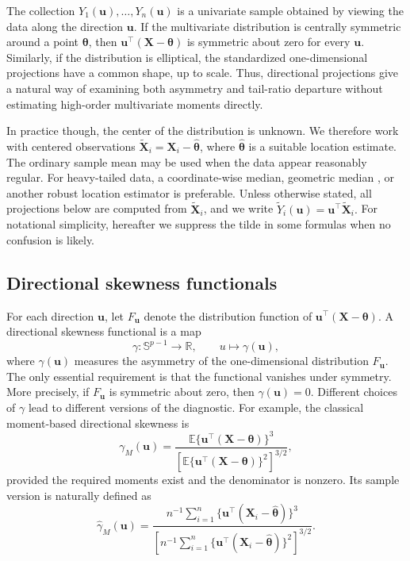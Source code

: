 \documentclass[11pt]{article}
\theoremstyle{plain}
\theoremstyle{definition}
\theoremstyle{remark}
\def\E{\mathbb{E}}
\def\X{\bm{X}}
\def\u{\bm{u}}
\newcommand{\boldtheta}{\bm{\theta}}
\begin{document}
The collection \(Y_1(\u),\ldots,Y_n(\u)\) is a univariate sample obtained by viewing the data along the direction $\u$. If the multivariate distribution is centrally symmetric around a point $\boldtheta$, then \(\u^\top(\X-\boldtheta)\) is symmetric about zero for every $\u$. Similarly, if the distribution is elliptical, the standardized one-dimensional projections have a common shape, up to scale. Thus, directional projections give a natural way of examining both asymmetry and tail-ratio departure without estimating high-order multivariate moments directly. 

In practice though, the center of the distribution is unknown. We therefore work with centered observations $\widetilde{\X}_i=\X_i-\widehat{\boldtheta}$, where \(\widehat{\boldtheta}\) is a suitable location estimate. The ordinary sample mean may be used when the data appear reasonably regular. For heavy-tailed data, a coordinate-wise median, geometric median \citep[see][]{chaudhuri1996geometric}, or another robust location estimator is preferable. Unless otherwise stated, all projections below are computed from \(\widetilde{\X}_i\), and we write
\(
    \widetilde Y_i(\u) = \u^\top \widetilde{\X}_i.
\)
For notational simplicity, hereafter we suppress the tilde in some formulas when no confusion is likely.

\subsection{Directional skewness functionals}
\label{subsec:directional-skewness}

For each direction $\u$, let \(F_{\u}\) denote the distribution function of \(\u^\top(\X-\boldtheta)\). A directional skewness functional is a map
\[
\gamma:\mathbb{S}^{p-1}\to\mathbb R, \qquad u\mapsto \gamma(\u),
\]
where \(\gamma(\u)\) measures the asymmetry of the one-dimensional distribution \(F_{\u}\). The only essential requirement is that the functional vanishes under symmetry. More precisely, if \(F_{\u}\) is symmetric about zero, then \(\gamma(\u)=0\). Different choices of \(\gamma\) lead to different versions of the diagnostic. For example, the classical moment-based directional skewness is
\begin{equation*}
    \gamma_{M}(\u) = \frac{\E\{\u^\top(\X-\boldtheta)\}^3}
    {\left[\E\{\u^\top(\X-\boldtheta)\}^2\right]^{3/2}},
\end{equation*}
provided the required moments exist and the denominator is nonzero. Its sample version is naturally defined as
\begin{equation}
\label{eq:moment_based_skewness_statistic}
    \widehat\gamma_{M}(\u) = \frac{n^{-1}\sum_{i=1}^n \{\u^\top(\X_i-\widehat{\boldtheta})\}^3}
    {\left[n^{-1}\sum_{i=1}^n \{\u^\top(\X_i-\widehat{\boldtheta})\}^2 \right]^{3/2}}.
\end{equation}
\end{document}
